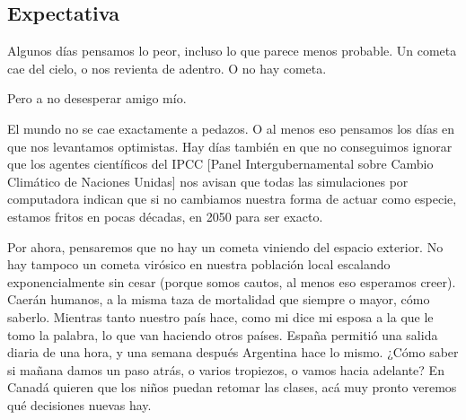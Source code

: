 \subsection{Expectativa}

Algunos días pensamos lo peor, incluso lo que parece menos probable.
Un cometa cae del cielo, o nos revienta de adentro. O no hay cometa.

Pero a no desesperar amigo mío.

El mundo no se cae exactamente a pedazos. O al menos eso
pensamos los días en que nos levantamos optimistas. Hay días también en
que no conseguimos ignorar que los agentes científicos del IPCC [Panel
Intergubernamental sobre Cambio Climático de Naciones Unidas] nos avisan
que todas las simulaciones por computadora indican que si no cambiamos
nuestra forma de actuar como especie, estamos fritos en pocas décadas, en 2050 para ser exacto.

Por ahora, pensaremos que no hay un cometa viniendo del espacio exterior. 
No hay tampoco un cometa virósico en nuestra población local 
escalando exponencialmente sin cesar (porque somos cautos, al menos eso esperamos creer). 
Caerán humanos, a la misma taza de mortalidad que siempre o mayor, cómo saberlo. 
Mientras tanto nuestro país hace, como mi dice mi esposa a la que le tomo la palabra, 
lo que van haciendo otros países. 
España permitió una salida diaria de una hora, y una semana después Argentina hace lo mismo. 
¿Cómo saber si mañana damos un paso atrás, o varios tropiezos, o vamos hacia adelante?
En Canadá quieren que los niños puedan retomar las clases, acá muy pronto veremos qué decisiones nuevas hay. 

